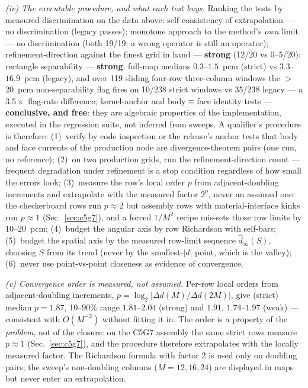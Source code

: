 \documentclass[11pt,a4paper]{article}
\begin{document}
\emph{(iv) The executable procedure, and what each test buys.}
Ranking the tests by measured discrimination on the data above:
self-consistency of extrapolation --- no discrimination (legacy
passes); monotone approach to the method's \emph{own} limit --- no
discrimination (both 19/19; a wrong operator is still an operator);
refinement-direction against the finest grid in hand ---
\textbf{strong} (12/20 vs 0--5/20); rectangle separability ---
\textbf{strong}: full-map medians $0.3$--$1.5$~pcm (strict) vs
$3.3$--$16.9$~pcm (legacy), and over 119 sliding four-row
three-column windows the $>$20~pcm non-separability flag fires on
10/238 strict windows vs 35/238 legacy --- a $3.5\times$ flag-rate
difference;
kernel-anchor and body$\equiv$face identity tests ---
\textbf{conclusive, and free}: they are algebraic properties of the
implementation, executed in the regression suite, not inferred from
sweeps.  A qualifier's procedure is therefore: (1)~verify by code
inspection or the release's anchor tests that body and face currents
of the production node are divergence-theorem pairs (one run, no
reference); (2)~on two production grids, run the refinement-direction
count --- frequent degradation under refinement is a stop condition
regardless of how small the errors look; (3)~measure the row's local
order $p$ from adjacent-doubling increments and extrapolate with the
measured factor $2^p$, never an assumed one: the checkerboard rows run
$p\approx2$ but assembly rows with material-interface kinks run
$p\approx1$ (Sec.~\ref{sec:c5g7}), and a forced $1/M^2$ recipe
mis-sets those row limits by $10$--$20$~pcm; (4)~budget the angular
axis by row Richardson with self-bars; (5)~budget the spatial axis by
the measured row-limit sequence $\hat d_\infty(S)$, choosing $S$ from
its trend (never by the smallest-$|d|$ point, which is the valley);
(6)~never use point-vs-point closeness as evidence of convergence.

\emph{(v) Convergence order is measured, not assumed.} Per-row
local orders from adjacent-doubling increments,
$p = \log_2|\Delta d(M)/\Delta d(2M)|$, give (strict) median
$p=1.87$, 10--90\% range $1.81$--$2.04$ (strong) and $1.91$,
$1.74$--$1.97$ (weak) --- consistent with $O(M^{-2})$ without
fitting it in.  The order is a property of the \emph{problem}, not of
the closure: on the C5G7 assembly the same strict rows measure
$p\approx1$ (Sec.~\ref{sec:c5g7}), and the procedure therefore
extrapolates with the locally measured factor. The Richardson formula with factor 2 is used only on
doubling pairs; the sweep's non-doubling columns
($M=12,16,24$) are displayed in maps but never enter an
extrapolation.
\end{document}
